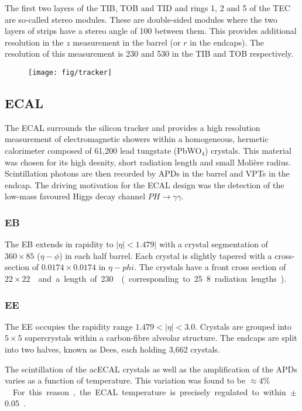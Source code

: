 The first two layers of the \ac{TIB}, \ac{TOB} and \ac{TID} and rings 1, 2 and 5
of the \ac{TEC} are so-called stereo modules. These are double-sided modules
where the two layers of strips have a stereo angle of \unit{100}{\milli\radian}
between them. This provides additional resolution in the $z$ measurement in the
barrel (or $r$ in the endcaps). The resolution of this measurement is
\unit{230}{\micro\metre} and \unit{530}{\micro\metre} in the \ac{TIB} and
\ac{TOB} respectively.

\begin{figure}
\texttt{[image: fig/tracker]}
\end{figure}

\subsection{\acl{ECAL}}
The \ac{ECAL} surrounds the silicon tracker and provides a high resolution
measurement of electromagnetic showers within a homogeneous, hermetic
calorimeter composed of 61,200 lead tungstate (PbWO$_4$) crystals. This material
was chosen for its high desnity, short radiation length and small Moli\`{e}re
radius. Scintillation photons are then recorded by \ac{APD}s in the barrel and
\ac{VPT}s in the endcap. The driving motivation for the \ac{ECAL} design was the
detection of the low-mass favoured Higgs decay channel
$PH\longrightarrow\gamma\gamma$.

\subsubsection{\acl{EB}}
The \ac{EB} extends in rapidity to $|\eta|<1.479|$ with a crystal
segmentation of $360\times 85$ ($\eta-\phi$) in each half barrel. Each crystal
is slightly tapered with a cross-section of $0.0174\times0.0174$ in
$\eta-phi$. The crystals have a front cross section of \unit{$22\times
  22$}{\milli\metre\squared} and a length of \unit{230}{\milli\metre}
(corresponding to 25.8 radiation lengths).

\subsubsection{\acl{EE}}
The \ac{EE} occupies the rapidity range $1.479 < |\eta| < 3.0$. Crystals are
grouped into $5\times 5$ supercrystals within a carbon-fibre alveolar
structure. The endcaps are split into two halves, known as Dees, each holding
3,662 crystals.

The scintillation of the ac{ECAL} crystals as well as the amplification of the
\acp{APD} varies as a function of temperature. This variation was found to be
\unit{$\approx 4\%$}{\per\celsius}. For this reason, the \ac{ECAL} temperature
is precisely regulated to within \unit{$\pm$ 0.05}{\celsius}.

